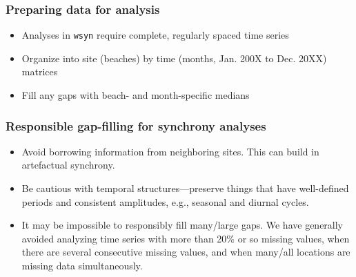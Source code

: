 \documentclass{beamer}
\begin{document}
\begin{frame}
\frametitle{Preparing data for analysis}
\begin{itemize}
\item Analyses in \texttt{wsyn} require complete, regularly spaced time series
\item Organize into site (beaches) by time (months, Jan. 200X to Dec. 20XX) matrices
\item Fill any gaps with beach- and month-specific medians
\end{itemize}
\end{frame}

\begin{frame}
\frametitle{Responsible gap-filling for synchrony analyses}
\begin{itemize}
\item Avoid borrowing information from neighboring sites. This can build in artefactual synchrony.
\item Be cautious with temporal structures---preserve things that have well-defined periods and consistent amplitudes, e.g., seasonal and diurnal cycles.
\item It may be impossible to responsibly fill many/large gaps. We have generally avoided analyzing time series with more than 20\% or so missing values, when there are several consecutive missing values, and when many/all locations are missing data simultaneously.
\end{itemize}
\end{frame}
\end{document}

